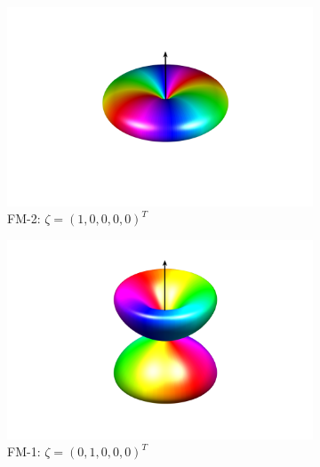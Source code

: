 \begin{figure}
    \centering
    \vspace{-2cm}
    \begin{subfigure}{0.49\textwidth}
        \includegraphics[width=\textwidth]
        {gfx/ch-groundStateSymmetries/FM-2-spherical.pdf}
        \caption{\label{subfig: FM-2-spherical}
        FM-2: \(\zeta={(1, 0, 0, 0, 0)}^T\)
        }
    \end{subfigure}
    \begin{subfigure}{0.49\textwidth}
        \includegraphics[width=\textwidth]
        {gfx/ch-groundStateSymmetries/FM-1-spherical.pdf}
        \caption{\label{subfig: FM-1-spherical}
        FM-1: \(\zeta={(0, 1, 0, 0, 0)}^T\)}
    \end{subfigure}\\
    \begin{subfigure}{0.49\textwidth}

\end{subfigure}
\end{figure}
